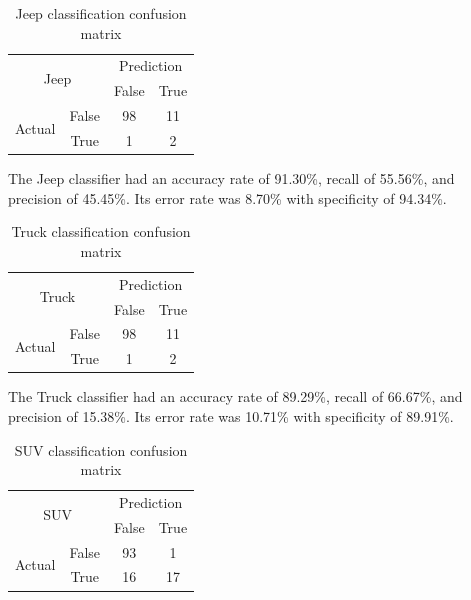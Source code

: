 \documentclass[conference]{IEEEtran}
\begin{document}
\begin{table}[]
\centering
\caption{Jeep classification confusion matrix}
\label{cm:jeep}
\begin{tabular}{|c|c|c|c|}
\hline
\multicolumn{2}{|c|}{\multirow{2}{*}{Jeep}} & \multicolumn{2}{c|}{Prediction} \\ \cline{3-4} 
\multicolumn{2}{|c|}{}                       & False          & True           \\ \hline
\multirow{2}{*}{Actual}         & False      & 98             & 11             \\ \cline{2-4} 
                                & True       &  1             &  2             \\ \hline
\end{tabular}
\end{table}

The Jeep classifier had an accuracy rate of 91.30\%, recall of 55.56\%, and precision of 45.45\%. Its error rate was 8.70\% with specificity of 94.34\%. 

\begin{table}[]
\centering
\caption{Truck classification confusion matrix}
\label{cm:truck}
\begin{tabular}{|c|c|c|c|}
\hline
\multicolumn{2}{|c|}{\multirow{2}{*}{Truck}} & \multicolumn{2}{c|}{Prediction} \\ \cline{3-4} 
\multicolumn{2}{|c|}{}                       & False          & True           \\ \hline
\multirow{2}{*}{Actual}         & False      & 98             & 11             \\ \cline{2-4} 
                                & True       &  1             &  2             \\ \hline
\end{tabular}
\end{table}

The Truck classifier had an accuracy rate of 89.29\%, recall of 66.67\%, and precision of 15.38\%. Its error rate was 10.71\% with specificity of 89.91\%. 

\begin{table}[]
\centering
\caption{SUV classification confusion matrix}
\label{cm:suv}
\begin{tabular}{|c|c|c|c|}
\hline
\multicolumn{2}{|c|}{\multirow{2}{*}{SUV}} & \multicolumn{2}{c|}{Prediction} \\ \cline{3-4} 
\multicolumn{2}{|c|}{}                       & False          & True           \\ \hline
\multirow{2}{*}{Actual}         & False      & 93             &  1              \\ \cline{2-4} 
                                & True       & 16             & 17             \\ \hline
\end{tabular}
\end{table}
\end{document}
